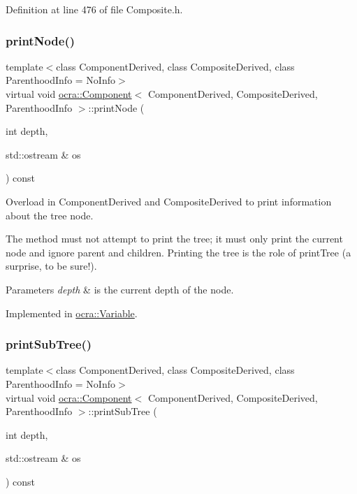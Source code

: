 Definition at line 476 of file Composite.\+h.

\hypertarget{classocra_1_1Component_a61bb6d9557a6ba3d13f9bc083422d1a7}{}\label{classocra_1_1Component_a61bb6d9557a6ba3d13f9bc083422d1a7} 
\subsubsection{\texorpdfstring{print\+Node()}{printNode()}}
{\footnotesize\ttfamily template$<$class Component\+Derived, class Composite\+Derived, class Parenthood\+Info = No\+Info$>$ \\
virtual void \hyperlink{classocra_1_1Component}{ocra\+::\+Component}$<$ Component\+Derived, Composite\+Derived, Parenthood\+Info $>$\+::print\+Node (\begin{DoxyParamCaption}\item[{int}]{depth,  }\item[{std\+::ostream \&}]{os }\end{DoxyParamCaption}) const\hspace{0.3cm}{\ttfamily [pure virtual]}}



Overload in Component\+Derived and Composite\+Derived to print information about the tree node. 

The method must not attempt to print the tree; it must only print the current node and ignore parent and children. Printing the tree is the role of print\+Tree (a surprise, to be sure!). 
\begin{DoxyParams}{Parameters}
{\em depth} & is the current depth of the node. \\
\hline
\end{DoxyParams}


Implemented in \hyperlink{classocra_1_1Variable_a0c983344cab7d6ca593cc21e47780b19}{ocra\+::\+Variable}.

\hypertarget{classocra_1_1Component_a3687a02c1524694fc616893264ca8199}{}\label{classocra_1_1Component_a3687a02c1524694fc616893264ca8199} 
\subsubsection{\texorpdfstring{print\+Sub\+Tree()}{printSubTree()}}
{\footnotesize\ttfamily template$<$class Component\+Derived, class Composite\+Derived, class Parenthood\+Info = No\+Info$>$ \\
virtual void \hyperlink{classocra_1_1Component}{ocra\+::\+Component}$<$ Component\+Derived, Composite\+Derived, Parenthood\+Info $>$\+::print\+Sub\+Tree (\begin{DoxyParamCaption}\item[{int}]{depth,  }\item[{std\+::ostream \&}]{os }\end{DoxyParamCaption}) const\hspace{0.3cm}{\ttfamily [pure virtual]}}




